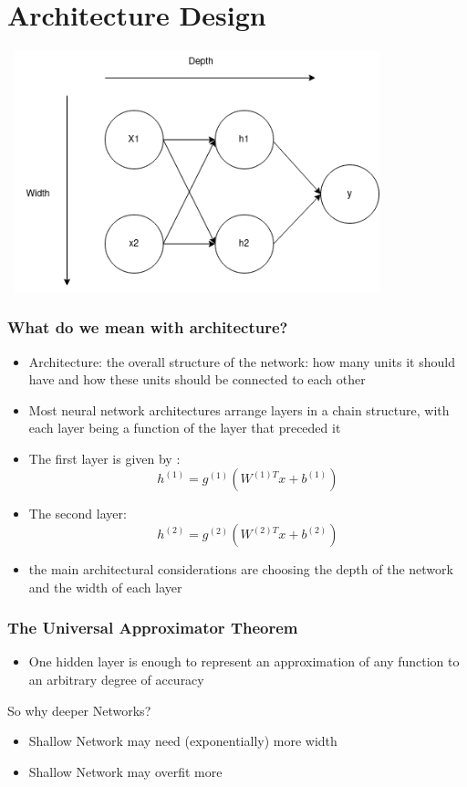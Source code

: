 \documentclass{beamer}
\begin{document}
\section{Architecture Design}
\begin{frame}
	\center 
	\includegraphics[width=110mm , height= 70mm]{width_depth.png}
	
\end{frame}
\begin{frame}
	\frametitle{What do we mean with architecture?}
	\begin{itemize}
		\item Architecture: the overall structure of the network: how many units it should have and how these units should be connected to each other
			\pause
		\item Most neural network architectures arrange layers in a chain structure, with each layer being a function of the layer that preceded it
			\pause
		\item The first layer is given by : 
			$$ h^{(1)} = g^{(1)}(W^{(1)T}x + b^{(1)})$$
		\item The second layer: 
			$$ h^{(2)} = g^{(2)}(W^{(2)T}x + b^{(2)})$$
			\pause
		\item the main architectural considerations are choosing the depth of the network and the width of each layer
	\end{itemize}
\end{frame}
\begin{frame}
	\frametitle{The Universal Approximator Theorem}
	\begin{itemize}
		\item One hidden layer is enough to represent an approximation of any function to an arbitrary degree of accuracy
	\end{itemize}
	\pause
	\center 
	So why deeper Networks?
	\pause
	\begin{itemize}
		\item Shallow Network may need (exponentially) more width
		\item Shallow Network may overfit more
	\end{itemize}
\end{frame}
\end{document}
